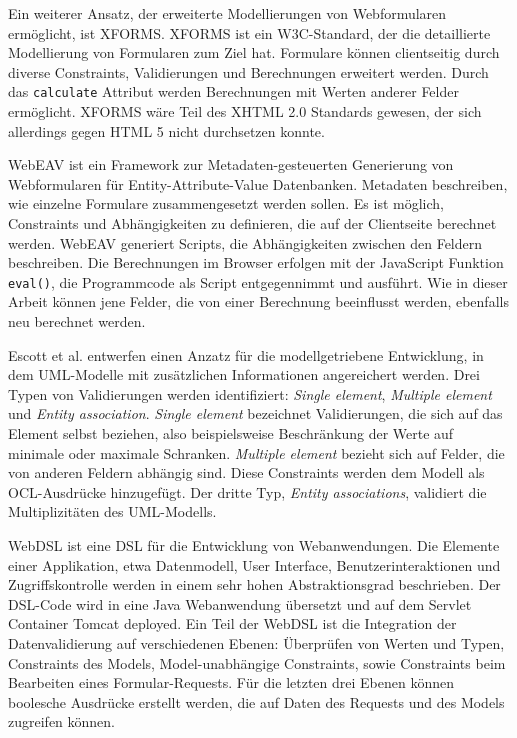 Ein weiterer Ansatz, der erweiterte Modellierungen von Webformularen er\-mög\-licht, ist XFORMS. XFORMS ist ein W3C-Standard\cite{Xfor09}, der die detaillierte Modellierung von Formularen zum Ziel hat. Formulare können clientseitig durch diverse Constraints, Validierungen und Berechnungen erweitert werden. Durch das \texttt{calculate} Attribut werden Berechnungen mit Werten anderer Felder er\-mög\-licht\cite{Chas07}. XFORMS wäre Teil des XHTML 2.0 Standards gewesen, der sich allerdings gegen HTML 5 nicht durchsetzen konnte.

WebEAV\cite{NaPr00} ist ein Framework zur Metadaten-gesteuerten Generierung von Webformularen für Entity-Attribute-Value Datenbanken. Metadaten be\-schrei\-ben, wie einzelne Formulare zusammengesetzt werden sollen. Es ist möglich, Constraints und Abhängigkeiten zu definieren, die auf der Clientseite berechnet werden. WebEAV generiert Scripts, die Abhängigkeiten zwischen den Feldern be\-schrei\-ben. Die Berechnungen im Browser erfolgen mit der Java\-Script Funktion \texttt{eval()}, die Programmcode als Script entgegennimmt und ausführt. Wie in dieser Arbeit können jene Felder, die von einer Berechnung beeinflusst werden, ebenfalls neu berechnet werden.

Escott et al.\cite{Esco12} entwerfen einen Anzatz für die modellgetriebene Entwicklung, in dem UML-Modelle mit zusätzlichen Informationen angereichert werden. Drei Typen von Validierungen werden identifiziert: \emph{Single element}, \emph{Multiple element} und \emph{Entity association}. \emph{Single element} bezeichnet Validierungen, die sich auf das Element selbst beziehen, also beispielsweise Beschränkung der Werte auf minimale oder maximale Schranken. \emph{Multiple element} bezieht sich auf Felder, die von anderen Feldern abhängig sind. Diese Constraints werden dem Modell als OCL-Ausdrücke hinzugefügt. Der dritte Typ, \emph{Entity associations}, validiert die Multiplizitäten des UML-Modells.

WebDSL\cite{Vis08} ist eine DSL für die Entwicklung von Webanwendungen. Die Elemente einer Applikation, etwa Datenmodell, User Interface, Benutzerinteraktionen und Zugriffskontrolle werden in einem sehr hohen Abstraktionsgrad beschrieben. Der DSL-Code wird in eine Java Webanwendung übersetzt und auf dem Servlet Container Tomcat deployed. Ein Teil der WebDSL ist die Integration der Datenvalidierung\cite{GrVi09} auf verschiedenen Ebenen: Überprüfen von Werten und Typen, Constraints des Models, Model-unabhängige Constraints, sowie Constraints beim Bearbeiten eines Formular-Requests. Für die letzten drei Ebenen können boolesche Ausdrücke erstellt werden, die auf Daten des Requests und des Models zugreifen können.


